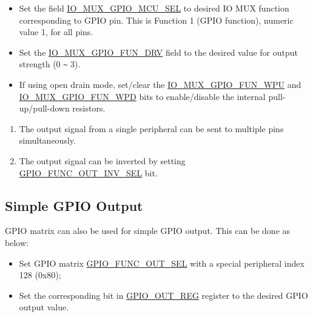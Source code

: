 \documentclass[main\_\_EN.tex]{subfiles}
\begin{document}
\begin{enumerate}
    \begin{itemize}
        \item Set the field \hyperref[fielddesc:IOMUXGPIONMCUSEL]{IO\_MUX\_GPIO\_MCU\_SEL} to desired IO MUX function corresponding to GPIO pin. This is Function 1 (GPIO function), numeric value 1, for all pins.
        \item Set the \hyperref[fielddesc:IOMUXGPIONFUNDRV]{IO\_MUX\_GPIO\_FUN\_DRV} field to the desired value for output strength (0 \verb+~+ 3). 
        \item If using open drain mode, set/clear the \hyperref[fielddesc:IOMUXGPIONFUNWPU]{IO\_MUX\_GPIO\_FUN\_WPU} and \hyperref[fielddesc:IOMUXGPIONFUNWPD]{IO\_MUX\_GPIO\_FUN\_WPD} bits to enable/disable the internal pull-up/pull-down resistors.
    \end{itemize}
\end{enumerate}

\begin{tiplisting}
\vspace{-2em}
\begin{enumerate}
\item \label{output-note-1} The output signal from a single peripheral can be sent to multiple pins simultaneously.
\item \label{output-note-2} The output signal can be inverted by setting \hyperref[fielddesc:GPIOFUNCNOUTINVSEL]{GPIO\_FUNC\_OUT\_INV\_SEL} bit.
\end{enumerate}
\end{tiplisting}

\subsection{Simple GPIO Output}

GPIO matrix can also be used for simple GPIO output. This can be done as below:

\begin{itemize}
    \item Set GPIO matrix \hyperref[fielddesc:GPIOFUNCNOUTSEL]{GPIO\_FUNC\_OUT\_SEL} with a special peripheral index 128 (0x80);
    \item Set the corresponding bit in \hyperref[regdesc:GPIOOUTREG]{GPIO\_OUT\_REG} register to the desired GPIO output value.
\end{itemize}
\end{document}
